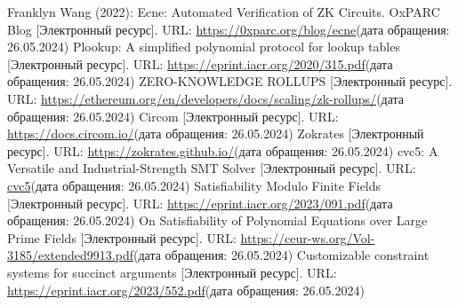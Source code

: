 \documentclass[a4paper]{article}
\begin{document}
\begin{thebibliography}{}
      Franklyn Wang (2022): Ecne: Automated Verification of ZK Circuits. OxPARC Blog [Электронный ресурс]. URL: \href{https://0xparc.org/blog/ecne}{https://0xparc.org/blog/ecne}(дата обращения: 26.05.2024)
      Plookup: A simplified polynomial protocol for
    lookup tables [Электронный ресурс]. URL: \href{https://eprint.iacr.org/2020/315.pdf}{https://eprint.iacr.org/2020/315.pdf}(дата обращения: 26.05.2024)
      ZERO-KNOWLEDGE ROLLUPS [Электронный ресурс]. URL: \href{https://ethereum.org/en/developers/docs/scaling/zk-rollups/}{https://ethereum.org/en/developers/docs/scaling/zk-rollups/}(дата обращения: 26.05.2024)
      Circom [Электронный ресурс]. URL: \href{https://docs.circom.io/}{https://docs.circom.io/}(дата обращения: 26.05.2024)
      Zokrates [Электронный ресурс]. URL: \href{https://zokrates.github.io/}{https://zokrates.github.io/}(дата обращения: 26.05.2024)
      cvc5: A Versatile and Industrial-Strength SMT Solver [Электронный ресурс]. URL: \href{https://link.springer.com/chapter/10.1007/978-3-030-99524-9_24}{cvc5}(дата обращения: 26.05.2024)
      Satisfiability Modulo Finite Fields [Электронный ресурс]. URL: \href{https://eprint.iacr.org/2023/091.pdf}{https://eprint.iacr.org/2023/091.pdf}(дата обращения: 26.05.2024)
      On Satisfiability of Polynomial Equations over Large Prime Fields [Электронный ресурс]. URL: \href{https://ceur-ws.org/Vol-3185/extended9913.pdf}{https://ceur-ws.org/Vol-3185/extended9913.pdf}(дата обращения: 26.05.2024)
      Customizable constraint systems for succinct arguments [Электронный ресурс]. URL: \href{https://eprint.iacr.org/2023/552.pdf}{https://eprint.iacr.org/2023/552.pdf}(дата обращения: 26.05.2024)
\end{thebibliography}
\end{document}
